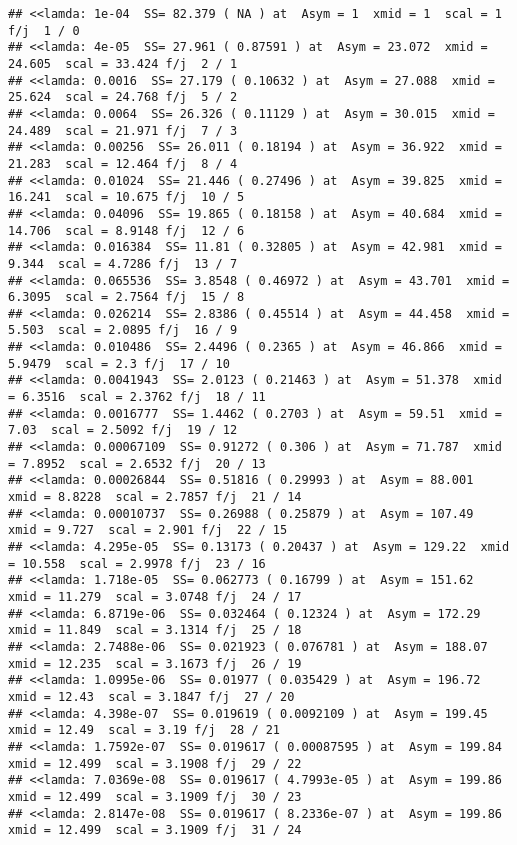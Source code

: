 \documentclass[
]{article}
\begin{document}
\begin{verbatim}
## <<lamda: 1e-04  SS= 82.379 ( NA ) at  Asym = 1  xmid = 1  scal = 1 f/j  1 / 0
## <<lamda: 4e-05  SS= 27.961 ( 0.87591 ) at  Asym = 23.072  xmid = 24.605  scal = 33.424 f/j  2 / 1
## <<lamda: 0.0016  SS= 27.179 ( 0.10632 ) at  Asym = 27.088  xmid = 25.624  scal = 24.768 f/j  5 / 2
## <<lamda: 0.0064  SS= 26.326 ( 0.11129 ) at  Asym = 30.015  xmid = 24.489  scal = 21.971 f/j  7 / 3
## <<lamda: 0.00256  SS= 26.011 ( 0.18194 ) at  Asym = 36.922  xmid = 21.283  scal = 12.464 f/j  8 / 4
## <<lamda: 0.01024  SS= 21.446 ( 0.27496 ) at  Asym = 39.825  xmid = 16.241  scal = 10.675 f/j  10 / 5
## <<lamda: 0.04096  SS= 19.865 ( 0.18158 ) at  Asym = 40.684  xmid = 14.706  scal = 8.9148 f/j  12 / 6
## <<lamda: 0.016384  SS= 11.81 ( 0.32805 ) at  Asym = 42.981  xmid = 9.344  scal = 4.7286 f/j  13 / 7
## <<lamda: 0.065536  SS= 3.8548 ( 0.46972 ) at  Asym = 43.701  xmid = 6.3095  scal = 2.7564 f/j  15 / 8
## <<lamda: 0.026214  SS= 2.8386 ( 0.45514 ) at  Asym = 44.458  xmid = 5.503  scal = 2.0895 f/j  16 / 9
## <<lamda: 0.010486  SS= 2.4496 ( 0.2365 ) at  Asym = 46.866  xmid = 5.9479  scal = 2.3 f/j  17 / 10
## <<lamda: 0.0041943  SS= 2.0123 ( 0.21463 ) at  Asym = 51.378  xmid = 6.3516  scal = 2.3762 f/j  18 / 11
## <<lamda: 0.0016777  SS= 1.4462 ( 0.2703 ) at  Asym = 59.51  xmid = 7.03  scal = 2.5092 f/j  19 / 12
## <<lamda: 0.00067109  SS= 0.91272 ( 0.306 ) at  Asym = 71.787  xmid = 7.8952  scal = 2.6532 f/j  20 / 13
## <<lamda: 0.00026844  SS= 0.51816 ( 0.29993 ) at  Asym = 88.001  xmid = 8.8228  scal = 2.7857 f/j  21 / 14
## <<lamda: 0.00010737  SS= 0.26988 ( 0.25879 ) at  Asym = 107.49  xmid = 9.727  scal = 2.901 f/j  22 / 15
## <<lamda: 4.295e-05  SS= 0.13173 ( 0.20437 ) at  Asym = 129.22  xmid = 10.558  scal = 2.9978 f/j  23 / 16
## <<lamda: 1.718e-05  SS= 0.062773 ( 0.16799 ) at  Asym = 151.62  xmid = 11.279  scal = 3.0748 f/j  24 / 17
## <<lamda: 6.8719e-06  SS= 0.032464 ( 0.12324 ) at  Asym = 172.29  xmid = 11.849  scal = 3.1314 f/j  25 / 18
## <<lamda: 2.7488e-06  SS= 0.021923 ( 0.076781 ) at  Asym = 188.07  xmid = 12.235  scal = 3.1673 f/j  26 / 19
## <<lamda: 1.0995e-06  SS= 0.01977 ( 0.035429 ) at  Asym = 196.72  xmid = 12.43  scal = 3.1847 f/j  27 / 20
## <<lamda: 4.398e-07  SS= 0.019619 ( 0.0092109 ) at  Asym = 199.45  xmid = 12.49  scal = 3.19 f/j  28 / 21
## <<lamda: 1.7592e-07  SS= 0.019617 ( 0.00087595 ) at  Asym = 199.84  xmid = 12.499  scal = 3.1908 f/j  29 / 22
## <<lamda: 7.0369e-08  SS= 0.019617 ( 4.7993e-05 ) at  Asym = 199.86  xmid = 12.499  scal = 3.1909 f/j  30 / 23
## <<lamda: 2.8147e-08  SS= 0.019617 ( 8.2336e-07 ) at  Asym = 199.86  xmid = 12.499  scal = 3.1909 f/j  31 / 24
\end{verbatim}
\end{document}
